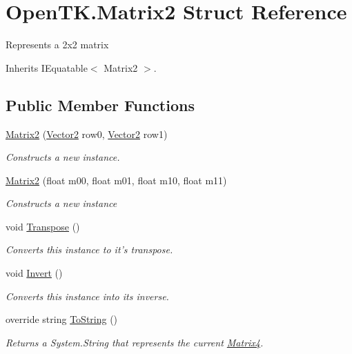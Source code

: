 \hypertarget{struct_open_t_k_1_1_matrix2}{\section{Open\-T\-K.\-Matrix2 Struct Reference}
\label{struct_open_t_k_1_1_matrix2}
}


Represents a 2x2 matrix  




Inherits I\-Equatable$<$ Matrix2 $>$.

\subsection*{Public Member Functions}
\begin{DoxyCompactItemize}
\item 
\hyperlink{struct_open_t_k_1_1_matrix2_a3d7d4c73c782db56b4373217ba880b86}{Matrix2} (\hyperlink{struct_open_t_k_1_1_vector2}{Vector2} row0, \hyperlink{struct_open_t_k_1_1_vector2}{Vector2} row1)
\begin{DoxyCompactList}\small\item\em Constructs a new instance. \end{DoxyCompactList}\item 
\hyperlink{struct_open_t_k_1_1_matrix2_afec74569441d89ffe2e376f4e3878d12}{Matrix2} (float m00, float m01, float m10, float m11)
\begin{DoxyCompactList}\small\item\em Constructs a new instance \end{DoxyCompactList}\item 
void \hyperlink{struct_open_t_k_1_1_matrix2_aabd2bd46c55b719370acea2f8f4edc80}{Transpose} ()
\begin{DoxyCompactList}\small\item\em Converts this instance to it's transpose. \end{DoxyCompactList}\item 
void \hyperlink{struct_open_t_k_1_1_matrix2_ad5dd7a1b85a14f2395461d8ab5d8cbe6}{Invert} ()
\begin{DoxyCompactList}\small\item\em Converts this instance into its inverse. \end{DoxyCompactList}\item 
override string \hyperlink{struct_open_t_k_1_1_matrix2_a5c83d326f4cfaf69427eca93e05f2764}{To\-String} ()
\begin{DoxyCompactList}\small\item\em Returns a System.\-String that represents the current \hyperlink{struct_open_t_k_1_1_matrix4}{Matrix4}. \end{DoxyCompactList}\item 

\end{DoxyCompactItemize}
